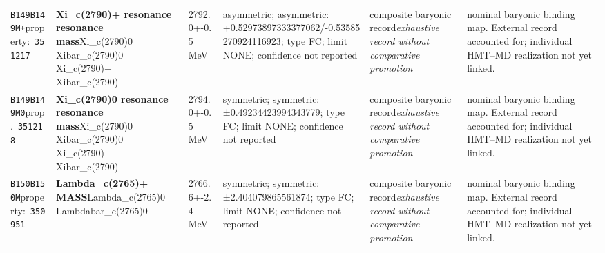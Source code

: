 \begin{landscape}
\begin{longtable}{L{1.85cm}L{4.45cm}L{2.35cm}L{4.05cm}L{3.35cm}L{7.15cm}}
\texttt{B149}\newline \texttt{B149M+}\newline property:\ \texttt{351217} & \textbf{Xi\_\allowbreak{}c(2790)+ resonance resonance mass}\newline Xi\_\allowbreak{}c(2790)0 \textbar{}\allowbreak{} Xibar\_\allowbreak{}c(2790)0 \textbar{}\allowbreak{} Xi\_\allowbreak{}c(2790)+ \textbar{}\allowbreak{} Xibar\_\allowbreak{}c(2790)- & 2792.0+-0.5\,MeV & asymmetric; asymmetric: +0.52973897333377062/-0.53585270924116923; type FC; limit NONE; confidence not reported & composite baryonic record\newline \emph{exhaustive record without comparative promotion} & nominal baryonic binding map. External record accounted for; individual HMT--MD realization not yet linked. \\
\texttt{B149}\newline \texttt{B149M0}\newline prop.\ \texttt{351218} & \textbf{Xi\_\allowbreak{}c(2790)0 resonance resonance mass}\newline Xi\_\allowbreak{}c(2790)0 \textbar{}\allowbreak{} Xibar\_\allowbreak{}c(2790)0 \textbar{}\allowbreak{} Xi\_\allowbreak{}c(2790)+ \textbar{}\allowbreak{} Xibar\_\allowbreak{}c(2790)- & 2794.0+-0.5\,MeV & symmetric; symmetric: ±0.49234423994343779; type FC; limit NONE; confidence not reported & composite baryonic record\newline \emph{exhaustive record without comparative promotion} & nominal baryonic binding map. External record accounted for; individual HMT--MD realization not yet linked. \\
\texttt{B150}\newline \texttt{B150M}\newline property:\ \texttt{350951} & \textbf{Lambda\_\allowbreak{}c(2765)+ MASS}\newline Lambda\_\allowbreak{}c(2765)0 \textbar{}\allowbreak{} Lambdabar\_\allowbreak{}c(2765)0 & 2766.6+-2.4\,MeV & symmetric; symmetric: ±2.404079865561874; type FC; limit NONE; confidence not reported & composite baryonic record\newline \emph{exhaustive record without comparative promotion} & nominal baryonic binding map. External record accounted for; individual HMT--MD realization not yet linked. \\

\end{longtable}
\end{landscape}
